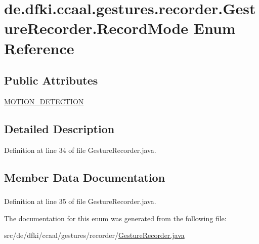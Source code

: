 \hypertarget{enumde_1_1dfki_1_1ccaal_1_1gestures_1_1recorder_1_1_gesture_recorder_1_1_record_mode}{\section{de.\-dfki.\-ccaal.\-gestures.\-recorder.\-Gesture\-Recorder.\-Record\-Mode Enum Reference}
\label{enumde_1_1dfki_1_1ccaal_1_1gestures_1_1recorder_1_1_gesture_recorder_1_1_record_mode}
}
\subsection*{Public Attributes}
\begin{DoxyCompactItemize}
\item 
\hyperlink{enumde_1_1dfki_1_1ccaal_1_1gestures_1_1recorder_1_1_gesture_recorder_1_1_record_mode_aa822032d0a55252998eab74f36c38005}{M\-O\-T\-I\-O\-N\-\_\-\-D\-E\-T\-E\-C\-T\-I\-O\-N}
\end{DoxyCompactItemize}


\subsection{Detailed Description}


Definition at line 34 of file Gesture\-Recorder.\-java.



\subsection{Member Data Documentation}
\hypertarget{enumde_1_1dfki_1_1ccaal_1_1gestures_1_1recorder_1_1_gesture_recorder_1_1_record_mode_aa822032d0a55252998eab74f36c38005}{
\subsubsection[{M\-O\-T\-I\-O\-N\-\_\-\-D\-E\-T\-E\-C\-T\-I\-O\-N}]{}}\label{enumde_1_1dfki_1_1ccaal_1_1gestures_1_1recorder_1_1_gesture_recorder_1_1_record_mode_aa822032d0a55252998eab74f36c38005}


Definition at line 35 of file Gesture\-Recorder.\-java.



The documentation for this enum was generated from the following file\-:\begin{DoxyCompactItemize}
\item 
src/de/dfki/ccaal/gestures/recorder/\hyperlink{_gesture_recorder_8java}{Gesture\-Recorder.\-java}\end{DoxyCompactItemize}
